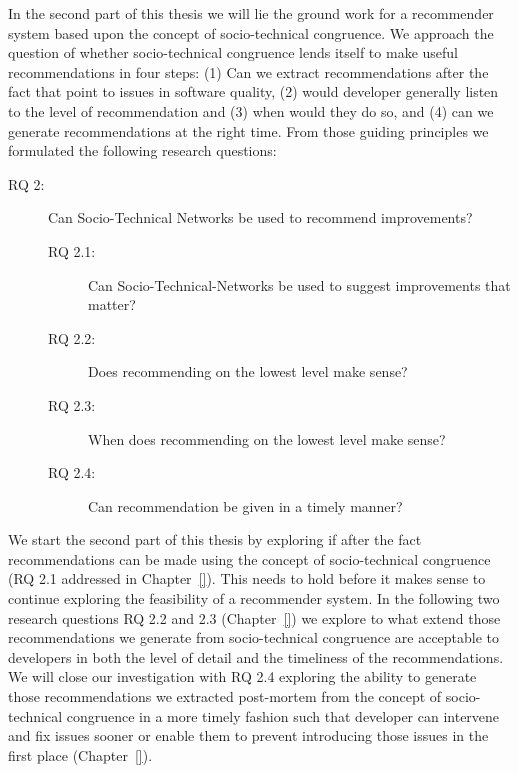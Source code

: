 In the second part of this thesis we will lie the ground work for a recommender system based upon the concept of socio-technical congruence.
We approach the question of whether socio-technical congruence lends itself to make useful recommendations in four steps: (1) Can we extract recommendations after the fact that point to issues in software quality, (2) would developer generally listen to the level of recommendation and (3) when would they do so, and (4) can we generate recommendations at the right time.
From those guiding principles we formulated the following research questions:

\begin{description}
%
\item[RQ 2:] Can Socio-Technical Networks be used to recommend improvements? 
  \begin{description}
  \item[RQ 2.1:] Can Socio-Technical-Networks be used to suggest improvements that matter?
  \item[RQ 2.2:] Does recommending on the lowest level make sense?
  \item[RQ 2.3:] When does recommending on the lowest level make sense?
  \item[RQ 2.4:] Can recommendation be given in a timely manner?
  \end{description}
\end{description}
We start the second part of this thesis by exploring if after the fact recommendations can be made using the concept of socio-technical congruence (RQ 2.1 addressed in Chapter~\ref{}).
This needs to hold before it makes sense to continue exploring the feasibility of a recommender system.
In the following two research questions RQ 2.2 and 2.3 (Chapter~\ref{}) we explore to what extend those recommendations we generate from socio-technical congruence are acceptable to developers in both the level of detail and the timeliness of the recommendations.
We will close our investigation with RQ 2.4 exploring the ability to generate those recommendations we extracted post-mortem from the concept of socio-technical congruence in a more timely fashion such that developer can intervene and fix issues sooner or enable them to prevent introducing those issues in the first place (Chapter~\ref{}). 

